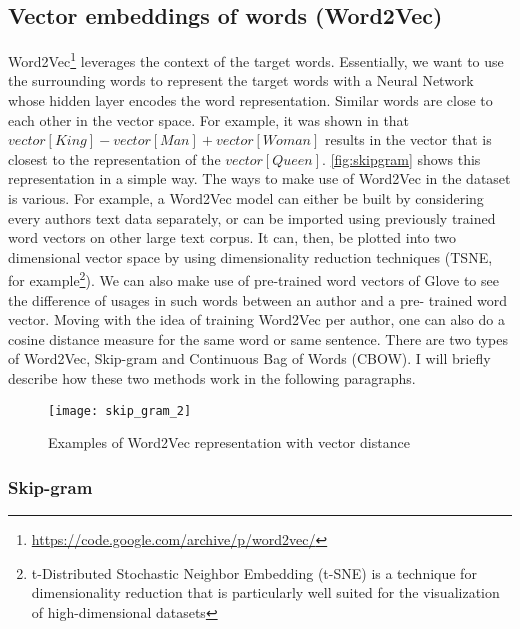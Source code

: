\subsection{Vector embeddings of words (Word2Vec)}
Word2Vec\footnote{\url{https://code.google.com/archive/p/word2vec/}} leverages the context of the target words. Essentially, we want to use the surrounding words to represent the target words with a Neural Network whose hidden layer encodes the word representation.
Similar words are close
to each other in the vector space. For example, it was shown in \cite{mikolov2013linguistic} that $vector[King] - vector[Man] + vector[Woman]$ results in the vector that is closest to the representation of the $vector[Queen]$.
\autoref{fig:skipgram} shows this representation in a simple way.
The ways to make use of Word2Vec in the dataset is various.
For example, a Word2Vec model can either be built by considering every authors
text data separately, or can be imported using previously trained word vectors on
other large text corpus. It can, then, be plotted into two dimensional vector space
by using dimensionality reduction techniques (TSNE, for example\footnote{t-Distributed Stochastic Neighbor Embedding (t-SNE) is a technique for dimensionality reduction that is particularly well suited for the visualization of high-dimensional datasets}). 
We can also make use of pre-trained word vectors of
Glove to see the difference of usages in such words between an author and a pre-
trained word vector.
Moving with the idea of training Word2Vec per author, one can also do a cosine
distance measure for the same word or same sentence.
There are two types of Word2Vec, Skip-gram and Continuous Bag of Words (CBOW). I will briefly describe how these two methods work in the following paragraphs.

\begin{figure}[ht]
	\centering
	\texttt{[image: skip\_gram\_2]}
	\caption[Word2Vec]{Examples of Word2Vec representation with vector distance}
	\label{fig:skipgram}
\end{figure}

\subsubsection{Skip-gram}

